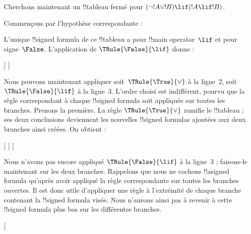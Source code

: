 \documentclass[../../../include/open-logic-section]{subfiles}
\begin{document}
\begin{ex}
Cherchons maintenant un !!{tableau} fermé pour
$(\lnot !A \lor !B) \lif (!A \lif !B)$.

Commençons par l'hypothèse correspondante :
\begin{oltableau}
  [\sFmla{\False}{(\lnot \formula{A} \lor \formula{B}) \lif
      (\formula{A} \lif \formula{B})}, just=\TAss]
\end{oltableau}
L'unique !!{signed formula} de ce !!{tableau} a pour
!!{main operator}~$\lif$ et pour signe~$\False$. L'application de
$\TRule{\False}{\lif}$ donne :
\begin{oltableau}
  [\sFmla{\False}{(\lnot \formula{A} \lor \formula{B})
      \lif (\formula{A} \lif \formula{B})}, just=\TAss, checked
    [\sFmla{\True}{\lnot \formula{A} \lor \formula{B}},
      just={\TRule{\False}{\lif}[1]}
      [\sFmla{\False}{(\formula{A} \lif \formula{B})},
        just={\TRule{\False}{\lif}[1]}
      ]
    ]
  ]
\end{oltableau}
Nous pouvons maintenant appliquer soit~$\TRule{\True}{\lor}$ à la
ligne~$2$, soit $\TRule{\False}{\lif}$ à la ligne~$3$. L'ordre choisi
est indifférent, pourvu que la règle correspondant à chaque
!!{signed formula} soit appliquée sur toutes les branches. Prenons la
première. La règle $\TRule{\True}{\lor}$ ramifie le !!{tableau} ; ses
deux conclusions deviennent les nouvelles !!{signed formula}s ajoutées
aux deux branches ainsi créées. On obtient :
\begin{oltableau}
  [\sFmla{\False}{(\lnot \formula{A} \lor \formula{B}) \lif
      (\formula{A} \lif \formula{B})}, just=\TAss, checked
    [\sFmla{\True}{\lnot \formula{A} \lor \formula{B}},
      just={\TRule{\False}{\lif}[1]}, checked
      [\sFmla{\False}{(\formula{A} \lif \formula{B})},
        just={\TRule{\False}{\lif}[1]}
        [\sFmla{\True}{\lnot \formula{A}}, just={\TRule{\True}{\lor}[2]}]
        [\sFmla{\True}{\formula{B}}, just={\TRule{\True}{\lor}[2]}]
      ]
    ]
  ]
\end{oltableau}
Nous n'avons pas encore appliqué $\TRule{\False}{\lif}$ à la ligne~$3$ ;
faisons-le maintenant sur les deux branches. Rappelons que nous ne
cochons !!a{signed formula} qu'après avoir appliqué la règle
correspondante sur toutes les branches ouvertes. Il est donc utile
d'appliquer une règle à l'extrémité de chaque branche contenant la
!!{signed formula} visée. Nous n'aurons ainsi pas à revenir à cette
!!{signed formula} plus bas sur les différentes branches.
\begin{oltableau}
  [
\end{oltableau}
\end{ex}
\end{document}
